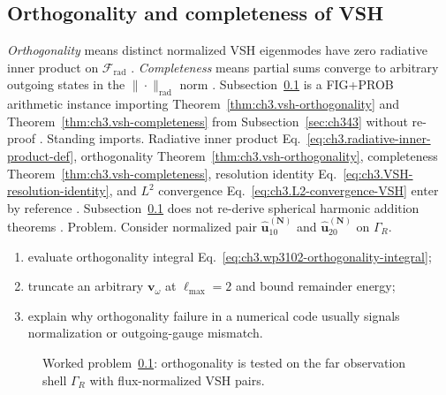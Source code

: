 \subsection{Orthogonality and completeness of VSH}
\label{sec:ch3102}
\emph{Orthogonality} means distinct normalized VSH eigenmodes have zero radiative inner product on \(\mathcal{F}_{\mathrm{rad}}\)
\cite{hansen1988}. \emph{Completeness} means partial sums converge to arbitrary outgoing states in the
\(\|\cdot\|_{\mathrm{rad}}\) norm \cite{kato1995}. Subsection~\ref{sec:ch3102} is a FIG+PROB arithmetic instance importing
Theorem~\ref{thm:ch3.vsh-orthogonality} and Theorem~\ref{thm:ch3.vsh-completeness} from Subsection~\ref{sec:ch343} without re-proof
\cite{stratton1941}.
Standing imports. Radiative inner product Eq.~\eqref{eq:ch3.radiative-inner-product-def}, orthogonality Theorem~\ref{thm:ch3.vsh-orthogonality},
completeness Theorem~\ref{thm:ch3.vsh-completeness}, resolution identity Eq.~\eqref{eq:ch3.VSH-resolution-identity}, and
\(L^{2}\) convergence Eq.~\eqref{eq:ch3.L2-convergence-VSH} enter by reference \cite{hansen1988}. Subsection~\ref{sec:ch3102}
does not re-derive spherical harmonic addition theorems \cite{jackson1999}.
Problem. Consider normalized pair \(\widehat{\mathbf{u}}_{10}^{(\mathbf{N})}\) and \(\widehat{\mathbf{u}}_{20}^{(\mathbf{N})}\) on \(\Gamma_R\).
\begin{enumerate}
\item[(a)] evaluate orthogonality integral Eq.~\eqref{eq:ch3.wp3102-orthogonality-integral};
\item[(b)] truncate an arbitrary \(\mathbf{v}_\omega\) at \(\ell_{\max}=2\) and bound remainder energy;
\item[(c)] explain why orthogonality failure in a numerical code usually signals normalization or outgoing-gauge mismatch.
\end{enumerate}
\begin{figure}[t]
\centering
{}
\caption{Worked problem~\ref{sec:ch3102}: orthogonality is tested on the far observation shell \(\Gamma_R\) with flux-normalized VSH pairs.}
\label{fig:ch3.3102-orthogonality-geometry}
\end{figure}
